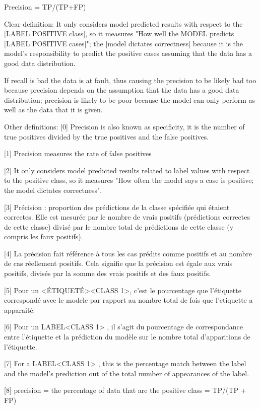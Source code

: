 \documentclass[11pt, onecolumn]{article}
\begin{document}
Precision = TP/(TP+FP)


Clear definition: It only considers model predicted results with respect to the [LABEL POSITIVE class], so it measures "How well the MODEL predicts [LABEL POSITIVE cases]"; the [model dictates correctness] because it is the model's responsibility to predict the positive cases assuming that the data has a good data distribution.

If recall is bad the data is at fault, thus causing the precision to be likely bad too because precision depends on the assumption that the data has a good data distribution; precision is likely to be poor because the model can only perform as well as the data that it is given.




Other definitions:
[0] Precision is also known as specificity, it is the number of true positives divided by the true positives and the false positives.

[1] Precision measures the rate of false positives

[2] It only considers model predicted results related to label values with respect to the positive class, so it measures "How often the model says a case is positive; the model dictates correctness". 

[3] Précision : proportion des prédictions de la classe spécifiée qui étaient correctes. Elle est mesurée par le nombre de vrais positifs (prédictions correctes de cette classe) divisé par le nombre total de prédictions de cette classe (y compris les faux positifs).

[4] La précision fait référence à tous les cas prédits comme positifs et au nombre de cas réellement positifs. Cela signifie que la précision est égale aux vrais positifs, divisés par la somme des vrais positifs et des faux positifs.

[5] Pour un <ÉTIQUETÉ><CLASS 1>, c'est le pourcentage que l'étiquette correspondé avec le modele par rapport au nombre total de fois que l'etiquette a apparaité.

[6] Pour un LABEL<CLASS 1> , il s'agit du pourcentage de correspondance entre l'étiquette et la prédiction du modèle sur le nombre total d'apparitions de l'étiquette.

[7] For a LABEL<CLASS 1> , this is the percentage match between the label and the model's prediction out of the total number of appearances of the label.

[8] precision =  the percentage of data that are the positive class  =  TP/(TP + FP)
\end{document}
